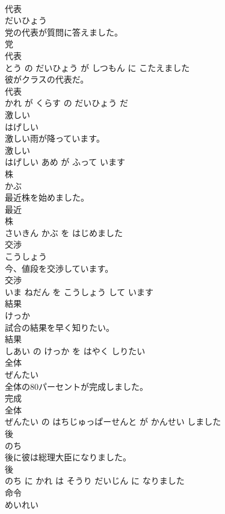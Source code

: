 \documentclass[8pt]{extreport}
\begin{document}
\begin{CJK}{UTF8}{min}
\\	代表	
\\	だいひょう			
\\	党の代表が質問に答えました。	
\\	党 
\\	代表 
\\	とう の だいひょう が しつもん に こたえました			
\\	彼がクラスの代表だ。	
\\	代表 
\\	かれ が くらす の だいひょう だ			
\\	激しい	
\\	はげしい			
\\	激しい雨が降っています。	
\\	激しい 
\\	はげしい あめ が ふって います			
\\	株	
\\	かぶ			
\\	最近株を始めました。	
\\	最近 
\\	株 
\\	さいきん かぶ を はじめました			
\\	交渉	
\\	こうしょう			
\\	今、値段を交渉しています。	
\\	交渉 
\\	いま ねだん を こうしょう して います			
\\	結果	
\\	けっか			
\\	試合の結果を早く知りたい。	
\\	結果 
\\	しあい の けっか を はやく しりたい			
\\	全体	
\\	ぜんたい			
\\	全体の80パーセントが完成しました。	
\\	完成 
\\	全体 
\\	ぜんたい の はちじゅっぱーせんと が かんせい しました			
\\	後	
\\	のち			
\\	後に彼は総理大臣になりました。	
\\	後 
\\	のち に かれ は そうり だいじん に なりました			
\\	命令	
\\	めいれい			

\end{CJK}
\end{document}
